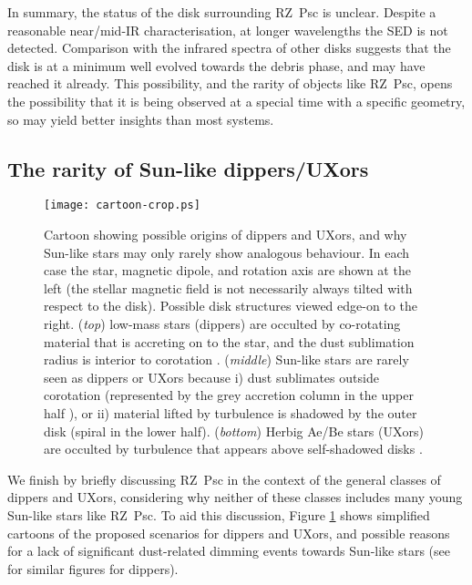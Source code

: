 \documentclass[]{rsos}
\begin{document}
In summary, the status of the disk surrounding RZ~Psc is unclear. Despite a reasonable
near/mid-IR characterisation, at longer wavelengths the SED is not detected. Comparison
with the infrared spectra of other disks suggests that the disk is at a minimum well
evolved towards the debris phase, and may have reached it already. This possibility, and
the rarity of objects like RZ~Psc, opens the possibility that it is being observed at a
special time with a specific geometry, so may yield better insights than most systems.

\subsection{The rarity of Sun-like dippers/UXors}\label{ss:rarity}

\begin{figure}
  \begin{center}
    \hspace{-0.5cm} \texttt{[image: cartoon-crop.ps]}
    \caption{Cartoon showing possible origins of dippers and UXors, and why Sun-like
      stars may only rarely show analogous behaviour. In each case the star, magnetic
      dipole, and rotation axis are shown at the left (the stellar magnetic field is not
      necessarily always tilted with respect to the disk). Possible disk structures
      viewed edge-on to the right. (\emph{top}) low-mass stars (dippers) are occulted by
      co-rotating material that is accreting on to the star, and the dust sublimation
      radius is interior to corotation \cite{2016arXiv160503985B}. (\emph{middle})
      Sun-like stars are rarely seen as dippers or UXors because i) dust sublimates
      outside corotation (represented by the grey accretion column in the upper half
      \cite{2016arXiv160503985B}), or ii) material lifted by turbulence is shadowed by
      the outer disk (spiral in the lower half). (\emph{bottom}) Herbig Ae/Be stars
      (UXors) are occulted by turbulence that appears above self-shadowed disks
      \cite{2003ApJ...594L..47D}.}\label{fig:cartoon}
  \end{center}
\end{figure}

We finish by briefly discussing RZ~Psc in the context of the general classes of dippers
and UXors, considering why neither of these classes includes many young Sun-like stars
like RZ~Psc. To aid this discussion, Figure \ref{fig:cartoon} shows simplified cartoons
of the proposed scenarios for dippers and UXors, and possible reasons for a lack of
significant dust-related dimming events towards Sun-like stars (see
\cite{2016arXiv160503985B} for similar figures for dippers).
\end{document}
